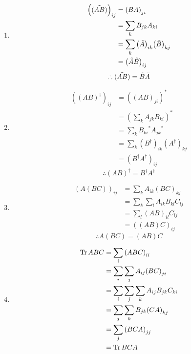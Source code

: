 \item

\begin{enumerate}[wide, labelindent = 0pt, label = (\alph*)]
\item
\begin{align*}
    {\left( \Tilde{(AB)} \right)}_{ij}
    &= {\left(BA\right)}_{ji} \\
    &= \sum_k B_{jk} A_{ki} \\
    &= \sum_k {\left( \Tilde{A} \right)}_{ik} {\left( \Tilde{B} \right)}_{kj} \\
    &= {\left( \Tilde{A} \Tilde{B} \right)}_{ij}
\end{align*}
\[
    \therefore \Tilde{(AB)} = \Tilde{B} \Tilde{A}
\]

\item
\begin{align*}
    {\left( {(AB)}^\dagger \right)}_{ij}
    &= {\left( {(AB)}_{ji} \right)}^* \\
    &= {\left( \sum_k A_{jk} B_{ki} \right)}^* \\
    &= \sum_k {B_{ki}}^* {A_{jk}}^* \\
    &= \sum_k {\left( B^\dagger \right)}_{ik} {\left( A^\dagger \right)}_{kj} \\
    &= {\left( B^\dagger A^\dagger \right)}_{ij}
\end{align*}
\[
    \therefore {(AB)}^\dagger = B^\dagger A^\dagger
\]

\item
\begin{align*}
    {(A (BC))}_{ij}
    &= \sum_k A_{ik} {(BC)}_{kj} \\
    &= \sum_k \sum_l A_{ik} B_{kl} C_{lj} \\
    &= \sum_l {(AB)}_{il} C_{lj} \\
    &= {((AB) C)}_{ij}
\end{align*}
\[
    \therefore A(BC) = (AB)C
\]

\item
\begin{align*}
    \operatorname{Tr} ABC
    &= \sum_i {(ABC)}_{ii} \\
    &= \sum_i \sum_j A_{ij} {(BC)}_{ji} \\
    &= \sum_i \sum_j \sum_k A_{ij} B_{jk} C_{ki} \\
    &= \sum_j \sum_k B_{jk} {(CA)}_{kj} \\
    &= \sum_j {(BCA)}_{jj} \\
    &= \operatorname{Tr} BCA
\end{align*}

\end{enumerate}
